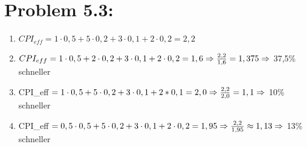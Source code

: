 \documentclass[10pt,a4paper]{article}
\begin{document}
\section*{Problem 5.3:}
\begin{enumerate}	
	\item $CPI_{eff} = 1 \cdot 0,5 + 5 \cdot 0,2 + 3 \cdot 0,1 + 2 \cdot 0,2 = 2,2$ 
	\item $CPI_{eff} = 1 \cdot 0,5 + 2 \cdot 0,2 + 3 \cdot 0,1 + 2 \cdot 0,2 = 1,6 \\
				\Rightarrow \frac{2,2}{1,6} = 1,375 \Rightarrow  $ 37,5\% schneller 
	\item CPI_{eff} $= 1 \cdot 0,5 + 5 \cdot 0,2 + 3 \cdot 0,1 + 2* 0,1 = 2,0 \\
				\Rightarrow \frac{2,2}{2,0} = 1,1 \Rightarrow  $ 10\% schneller
	\item CPI_{eff} $= 0,5 \cdot 0,5 + 5 \cdot 0,2 + 3 \cdot 0,1 + 2 \cdot 0,2 = 1,95 \\
				\Rightarrow \frac{2,2}{1,95} \approx 1,13  \Rightarrow $ 13\% schneller
\end{enumerate}
\end{document}
